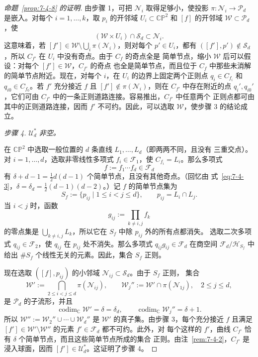 \begin{proof}[命题~\ref{prop:7-4-8} 的证明]
由步骤 1，可把 $\mathcal N_i$ 取得足够小，使投影
$\pi:\mathcal N_i\to\mathcal P_d$ 是嵌入。对每个 $i=1,\ldots,k$，取 $p_i$ 的开邻域
$U_i\subset\mathbb{CP}^2$ 和 $[f]$ 的开邻域 $\mathcal W\subset\mathcal P_d$，使
\[
  (\mathcal W\times U_i)\cap\mathcal S_d\subset\mathcal N_i.
\]
这意味着，若
$[f']\in\mathcal W\setminus\bigcup_i\pi(\mathcal N_i)$，则对每个 $p'\in U_i$，都有
$([f'],p')\notin\mathcal S_d$，所以 $C_{f'}$ 在 $U_i$ 中没有奇点。由于 $C_f$ 的奇点全是
简单节点，缩小 $\mathcal W$ 后可以假设：对每个 $[f']\in\mathcal W$，$C_{f'}$ 的奇点
也全是简单节点，而且位于 $C_f$ 中那些未消解的简单节点附近。现在，对每个 $i$，在
$U_i$ 的边界上固定两个正则点 $q_i\in C_{f_i}$ 和 $q_{i0}\in C_{f_0}$。若 $f'$ 充分接近
$f$ 且 $[f']\notin\pi(\mathcal N_i)$，则在 $C_{f'}$ 中存在附近的点
$q_i',q_{i0}'$，它们可由 $C_{f'}$ 中的一条正则道路连接。容易推出，$C_{f'}$ 中任意两个
正则点都可由其中的正则道路连接，因而 $f'$ 不可约。因此，可以选取 $\mathcal W$，使步骤
3 的结论成立。

\emph{步骤 4. $\mathcal U_d^*$ 非空。}

在 $\mathbb{CP}^2$ 中选取一般位置的 $d$ 条直线 $L_1,\ldots,L_d$（即两两不同，且没有
三重交点）。对 $i=1,\ldots,d$，选取非零线性多项式 $f_i\in\mathcal F_1$，使
$C_{f_i}=L_i$。那么多项式
\[
  f:=f_1\cdots f_d\in\mathcal F_d
\]
有 $\delta+d-1=\tfrac12d(d-1)$ 个简单节点，且没有其他奇点。（回忆由
式~\eqref{eq:7-4-3}，$\delta=\delta_d=\tfrac12(d-1)(d-2)$。）记 $f$ 的简单节点集为
\[
  S_f:=\{p_{ij}\mid1\le i<j\le d\},
  \qquad p_{ij}=L_i\cap L_j.
\]
当 $i<j$ 时，函数
\[
  g_{ij}:=\prod_{k\ne i,j}f_k
\]
的零点集是 $\bigcup_{k\ne i,j}L_k$，所以它在 $S_f$ 中除 $p_{ij}$ 外的所有点都消失。
选取二次多项式 $q_{ij}\in\mathcal F_2$，使 $q_{ij}$ 在 $p_{ij}$ 处不消失。那么多项式
$q_{ij}g_{ij}\in\mathcal F_d$ 在商空间
$\mathcal F_d/\mathcal H_{S_f}$ 中给出 $\#S_f$ 个线性无关的元素。因此，集合 $S_f$ 正则。

现在选取 $([f],p_{ij})$ 的小邻域 $\mathcal N_{ij}\subset\mathcal S_d$。由于 $S_f$ 正则，
集合
\[
  \mathcal W':=\bigcap_{2\le i<j\le d}\pi(\mathcal N_{ij}),
  \qquad
  \mathcal W_j'':=\mathcal W'\cap\pi(\mathcal N_{1j}),
  \quad 2\le j\le d,
\]
是 $\mathcal P_d$ 的子流形，并且
\[
  \operatorname{codim}_{\mathbb C}\mathcal W'=\delta=\delta_d,
  \qquad
  \operatorname{codim}_{\mathbb C}\mathcal W_j''=\delta+1.
\]
所以 $\mathcal W'':=\mathcal W_2''\cup\cdots\cup\mathcal W_d''$ 是
$\mathcal W'$ 的真子集。由步骤 3，每个充分接近 $f$ 且满足
$[f']\in\mathcal W'\setminus\mathcal W''$ 的元素 $f'\in\mathcal F_d$ 都不可约。此外，对
每个这样的 $f'$，曲线 $C_{f'}$ 恰有 $\delta$ 个简单节点，而且这些简单节点所成的集合
正则。由注~\ref{rem:7-4-2}，$C_{f'}$ 是浸入球面，因而
$[f']\in\mathcal U_d^*$。这证明了步骤 4。


\end{proof}

